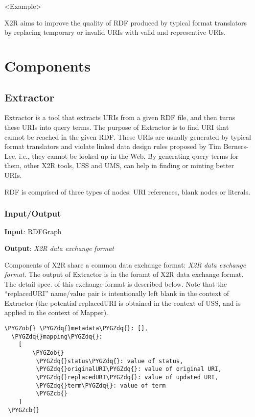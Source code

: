 \documentclass[letterpaper,10pt,english]{sphinxmanual}
\def\PYGZob{\char`\{}
\def\PYGZcb{\char`\}}
\def\PYGZdq{\char`\"}
\begin{document}
\textless{}Example\textgreater{}

X2R aims to improve the quality of RDF produced by typical format translators by replacing temporary or invalid URIs with valid and representive URIs.


\chapter{Components}
\label{index:components}

\section{Extractor}
\label{docs/extractor:extractor}\label{docs/extractor::doc}\label{docs/extractor:id1}
Extractor is a tool that extracts URIs from a given RDF file, and then turns these URIs into query terms. The purpose of Extractor is to find URI that cannot be reached in the given RDF. These URIs are usually generated by typical format translators and violate linked data design rules proposed by Tim Berners-Lee, i.e., they cannot be looked up in the Web. By generating query terms for them, other X2R tools, USS and UMS, can help in finding or minting better URIs.

RDF is comprised of three types of nodes: URI references, blank nodes or literals.


\subsection{Input/Output}
\label{docs/extractor:input-output}
\textbf{Input}: RDFGraph

\textbf{Output}: \emph{X2R data exchange format}

Components of X2R share a common data exchange format: \emph{X2R data exchange format}. The output of Extractor is in the foramt of X2R data exchange format. The detail spec. of this exchange format is described below. Note that the ``replacedURI'' name/value pair is intentionally left blank in the context of Extractor (the potential replacedURI is obtained in the context of USS, and is applied in the context of Mapper).

\begin{Verbatim}[commandchars=\\\{\}]
\PYGZob{} \PYGZdq{}metadata\PYGZdq{}: [],
  \PYGZdq{}mapping\PYGZdq{}:
    [
        \PYGZob{}
         \PYGZdq{}status\PYGZdq{}: value of status,
         \PYGZdq{}originalURI\PYGZdq{}: value of original URI,
         \PYGZdq{}replacedURI\PYGZdq{}: value of updated URI,
         \PYGZdq{}term\PYGZdq{}: value of term
         \PYGZcb{}
    ]
 \PYGZcb{}
\end{Verbatim}
\end{document}
